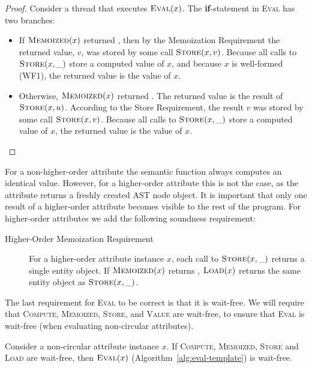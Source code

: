 {\begin{proof}
  Consider a thread that executes $\textsc{Eval}(x)$.
  The \textbf{if}-statement in \textsc{Eval} has two branches:

  \begin{itemize}
    \item
      If $\textsc{Memoized}(x)$ returned \true{},
      then by the Memoization Requirement the returned value, $v$,
      was stored by some call $\textsc{Store}(x, v)$.
      Because all calls to $\textsc{Store}(x, \_)$ store a computed value of $x$,
      and because $x$ is well-formed (WF1),
      the returned value is the value of $x$.
    \item
      Otherwise, $\textsc{Memoized}(x)$ returned \false{}.
      The returned value is the result of $\textsc{Store}(x, u)$.
      According to the Store Requirement, the result $v$
      was stored by some call $\textsc{Store}(x, v)$.
      Because all calls to $\textsc{Store}(x, \_)$ store a computed value of $x$,
      the returned value is the value of $x$.
  \end{itemize}
\end{proof}

For a non-higher-order attribute the semantic function always computes an identical value.
However, for a higher-order
attribute this is not the case, as the attribute returns a
freshly created AST node object.
It is important that only one result of a higher-order attribute becomes visible to
the rest of the program.
For higher-order attributes we add the following soundness requirement:

\begin{description}
  \item[Higher-Order Memoization Requirement]
    For a higher-order attribute instance $x$,
    each call to $\textsc{Store}(x, \_)$ returns a single entity object.
    If $\textsc{Memoized}(x)$ returns \true{},
    $\textsc{Load}(x)$ returns the same entity object as $\textsc{Store}(x, \_)$.
\end{description}

The last requirement for \textsc{Eval} to be correct is that it is wait-free.
We will require that \textsc{Compute}, \textsc{Memoized}, \textsc{Store}, and \textsc{Value}
are wait-free, to ensure that \textsc{Eval} is wait-free (when evaluating non-circular attributes).

\begin{theorem}
  Consider a non-circular attribute instance $x$.
  If \textsc{Compute}, \textsc{Memoized}, \textsc{Store} and \textsc{Load} are wait-free,
  then $\textsc{Eval}(x)$ (Algorithm~\ref{alg:eval-template}) is wait-free.


\end{theorem}}
